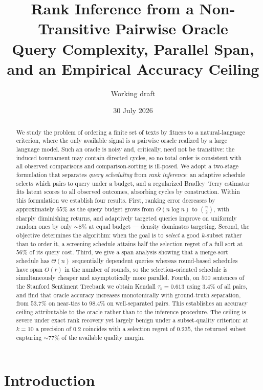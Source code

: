 \documentclass[11pt,a4paper]{article}
\title{\textbf{Rank Inference from a Non-Transitive Pairwise Oracle}\\
\large Query Complexity, Parallel Span, and an Empirical Accuracy Ceiling}
\author{Working draft}
\date{30 July 2026}
\begin{document}
\maketitle

\begin{abstract}
We study the problem of ordering a finite set of texts by fitness to a
natural-language criterion, where the only available signal is a pairwise oracle
realized by a large language model. Such an oracle is noisy and, critically, need
not be transitive: the induced tournament may contain directed cycles, so no
total order is consistent with all observed comparisons and comparison-sorting is
ill-posed. We adopt a two-stage formulation that separates \emph{query
scheduling} from \emph{rank inference}: an adaptive schedule selects which pairs
to query under a budget, and a regularized Bradley--Terry estimator fits latent
scores to all observed outcomes, absorbing cycles by construction. Within this
formulation we establish four results. First, ranking error decreases by
approximately $65\%$ as the query budget grows from $\Theta(n\log n)$ to
$\binom{n}{2}$, with sharply diminishing returns, and adaptively targeted queries
improve on uniformly random ones by only ${\sim}8\%$ at equal budget --- density
dominates targeting. Second, the objective determines the algorithm: when the
goal is to \emph{select} a good $k$-subset rather than to order it, a screening
schedule attains half the selection regret of a full sort at $56\%$ of its query
cost. Third, we give a span analysis showing that a merge-sort schedule has
$\Theta(n)$ sequentially dependent queries whereas round-based schedules have
span $O(r)$ in the number of rounds, so the selection-oriented schedule is
simultaneously cheaper and asymptotically more parallel. Fourth, on $500$
sentences of the Stanford Sentiment Treebank we obtain Kendall $\tau_b = 0.613$
using $3.4\%$ of all pairs, and find that oracle accuracy increases
monotonically with ground-truth separation, from $53.7\%$ on near-ties to
$98.4\%$ on well-separated pairs. This establishes an accuracy ceiling
attributable to the oracle rather than to the inference procedure. The ceiling is
severe under exact rank recovery yet largely benign under a subset-quality
criterion: at $k=10$ a precision of $0.2$ coincides with a selection regret of
$0.235$, the returned subset capturing ${\sim}77\%$ of the available quality
margin.
\end{abstract}

\section{Introduction}
\end{document}

